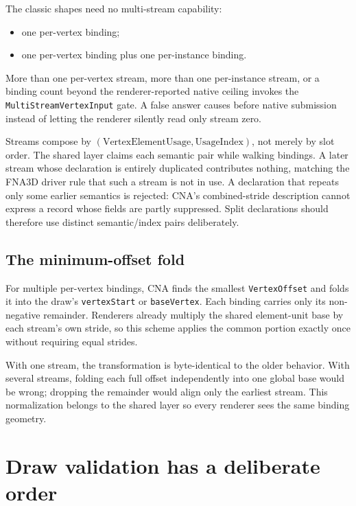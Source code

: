 The classic shapes need no multi-stream capability:

\begin{itemize}
  \item one per-vertex binding;
  \item one per-vertex binding plus one per-instance binding.
\end{itemize}

More than one per-vertex stream, more than one per-instance stream, or a binding count beyond the
renderer-reported native ceiling invokes the \texttt{MultiStreamVertexInput} gate.  A false answer
causes  before native submission instead of letting the renderer
silently read only stream zero.

Streams compose by \((\text{VertexElementUsage},\text{UsageIndex})\), not merely by slot order. The
shared layer claims each semantic pair while walking bindings. A later stream whose declaration is
entirely duplicated contributes nothing, matching the FNA3D driver rule that such a stream is not in
use. A declaration that repeats only some earlier semantics is rejected: CNA's combined-stride
description cannot express a record whose fields are partly suppressed. Split declarations should
therefore use distinct semantic/index pairs deliberately.

\subsection{The minimum-offset fold}

For multiple per-vertex bindings, CNA finds the smallest \texttt{VertexOffset} and folds it into the
draw's \texttt{vertexStart} or \texttt{baseVertex}.  Each binding carries only its non-negative
remainder.  Renderers already multiply the shared element-unit base by each stream's own stride,
so this scheme applies the common portion exactly once without requiring equal strides.

With one stream, the transformation is byte-identical to the older behavior.  With several streams,
folding each full offset independently into one global base would be wrong; dropping the remainder
would align only the earliest stream.  This normalization belongs to the shared layer so every
renderer sees the same binding geometry.

\section{Draw validation has a deliberate order}

